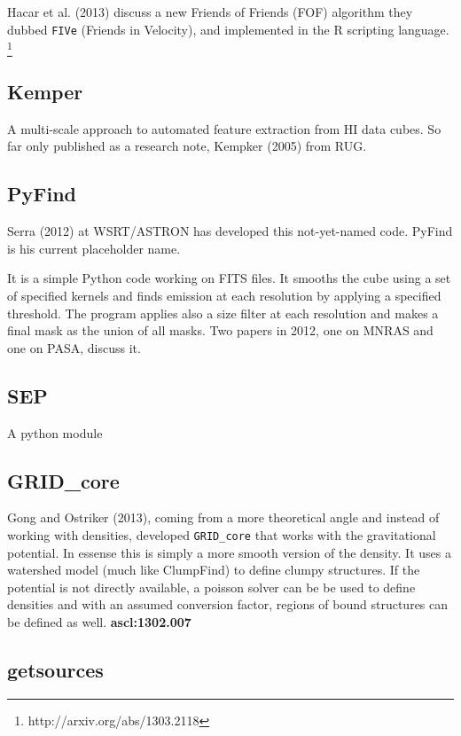 \documentclass[preprint]{aastex} %
\begin{document}
Hacar et al. (2013) discuss a new Friends of Friends (FOF) 
algorithm they dubbed {\tt FIVe} (Friends in Velocity), and
implemented in the R scripting language.
\footnote{http://arxiv.org/abs/1303.2118}


\subsection{Kemper}

A multi-scale approach to automated feature extraction from HI
data cubes. 
So far only published as a research note, Kempker (2005) from RUG.


\subsection{PyFind}

Serra (2012) at WSRT/ASTRON
has developed this not-yet-named code. PyFind is his current 
placeholder name. 

It is a simple Python code working on FITS files. It smooths
the cube using a set of specified kernels and finds emission at each
resolution by applying a specified threshold. The program applies also
a size filter at each resolution and makes a final mask as the union
of all masks. Two papers in 2012, one on MNRAS and one on PASA, discuss
it.

\subsection{SEP}

A python module %

\subsection{GRID\_core}

Gong and Ostriker (2013),
coming from a more theoretical angle and 
instead of working with densities, developed 
{\tt GRID\_core} that works with
the gravitational potential.
In essense this is simply a more smooth version of
the density. It uses a watershed model (much like ClumpFind)
to define clumpy structures.  If the potential is not directly
available, a poisson solver can be be used to define densities
and with an assumed conversion factor, regions of bound structures
can be defined as well.  {\bf ascl:1302.007}

\subsection{getsources}
\end{document}
